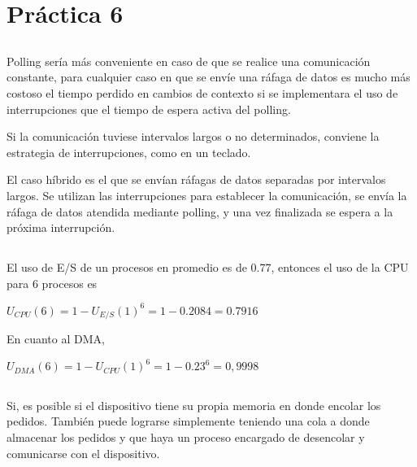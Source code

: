 \section{Práctica 6}

\subsection{}
Polling sería más conveniente en caso de que se realice una comunicación
constante, para cualquier caso en que se envíe una ráfaga de datos es mucho
más costoso el tiempo perdido en cambios de contexto si se implementara el
uso de interrupciones que el tiempo de espera activa del polling.

Si la comunicación tuviese intervalos largos o no determinados, conviene la
estrategia de interrupciones, como en un teclado.

El caso híbrido es el que se envían ráfagas de datos separadas por intervalos
largos. Se utilizan las interrupciones para establecer la comunicación, se
envía la ráfaga de datos atendida mediante polling, y una vez finalizada se
espera a la próxima interrupción.

\subsection{}
El uso de E/S de un procesos en promedio es de 0.77, entonces el uso de la CPU
para 6 procesos es

\begin{center}
$U_{CPU}(6) = 1 - U_{E/S}(1)^6 = 1 - 0.2084 = 0.7916$
\end{center}

En cuanto al DMA,

\begin{center}
$U_{DMA}(6) = 1 - U_{CPU}(1)^6 = 1 - 0.23^6 = 0,9998$
\end{center}

\subsection{}

\subsubsection{}
Si, es posible si el dispositivo tiene su propia memoria en donde encolar los
pedidos. También puede lograrse simplemente teniendo una cola a donde
almacenar los pedidos y que haya un proceso encargado de desencolar y
comunicarse con el dispositivo.

